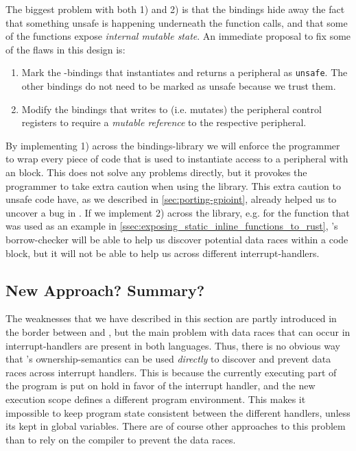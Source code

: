 The biggest problem with both 1) and 2) is that the bindings hide away the fact that something unsafe is happening underneath the function calls, and that some of the functions expose \emph{internal mutable state}.
An immediate proposal to fix some of the flaws in this design is:

\begin{enumerate}[\hspace{13}1)]
    \item Mark the {\rust}-bindings that instantiates and returns a peripheral as \texttt{unsafe}.
    The other bindings do not need to be marked as unsafe because we trust them.

    \item Modify the bindings that writes to (i.e. mutates) the peripheral control registers to require a \emph{mutable reference} to the respective peripheral.
\end{enumerate}

By implementing 1) across the bindings-library we will enforce the programmer to wrap every piece of code that is used to instantiate access to a peripheral with an  block.
This does not solve any problems directly, but it provokes the programmer to take extra caution when using the library.
This extra caution to unsafe code have, as we described in \autoref{sec:porting-gpioint}, already helped us to  uncover a bug in .
If we implement 2) across the library, e.g. for the function that was used as an example in \autoref{ssec:exposing_static_inline_functions_to_rust}, {\rust}'s borrow-checker will be able to help us discover potential data races within a code block, but it will not be able to help us across different interrupt-handlers.

\subsection{New Approach? Summary?}

The weaknesses that we have described in this section are partly introduced in the border between {\rust} and {\C}, but the main problem with data races that can occur in interrupt-handlers are present in both languages.
Thus, there is no obvious way that {\rust}'s ownership-semantics can be used \emph{directly} to discover and prevent data races across interrupt handlers.
This is because the currently executing part of the program is put on hold in favor of the interrupt handler, and the new execution scope defines a different program environment.
This makes it impossible to keep program state consistent between the different handlers, unless its kept in global variables.
There are of course other approaches to this problem than to rely on the compiler to prevent the data races.

